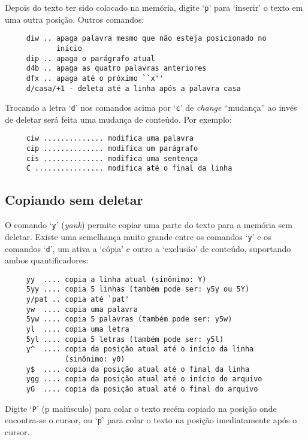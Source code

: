 Depois do texto ter sido colocado na memória, digite `{\tt p}' para `inserir' o
texto em uma outra posição. Outros comandos:

\begin{verbatim}
     diw .. apaga palavra mesmo que não esteja posicionado no 
            início
     dip .. apaga o parágrafo atual
     d4b .. apaga as quatro palavras anteriores
     dfx .. apaga até o próximo ``x''
     d/casa/+1 - deleta até a linha após a palavra casa
\end{verbatim}

Trocando a letra `{\tt d}' nos comandos acima por `{\tt c}' de {\em change}
``mudança'' ao invés de deletar será feita uma mudança de conteúdo.  Por
exemplo:

\begin{verbatim}
     ciw .............. modifica uma palavra
     cip .............. modifica um parágrafo
     cis .............. modifica uma sentença
     C ................ modifica até o final da linha
\end{verbatim}

\subsection{Copiando sem deletar}\label{Copiando sem deletar}

O comando `{\tt y}' ({\em yank}) permite copiar uma parte do 
texto para a memória sem deletar.  Existe uma semelhança muito grande entre 
os comandos `{\tt y}' e os comandos `{\tt d}', um ativa a `cópia' e outro a 
`exclusão' de conteúdo, suportando ambos quantificadores:

\begin{verbatim}
     yy  .... copia a linha atual (sinônimo: Y)
     5yy .... copia 5 linhas (também pode ser: y5y ou 5Y)
     y/pat .. copia até `pat'
     yw  .... copia uma palavra
     5yw .... copia 5 palavras (também pode ser: y5w)
     yl  .... copia uma letra
     5yl .... copia 5 letras (também pode ser: y5l)
     y^  .... copia da posição atual até o início da linha
              (sinônimo: y0)
     y$  .... copia da posição atual até o final da linha
     ygg .... copia da posição atual até o início do arquivo
     yG  .... copia da posição atual até o final do arquivo
\end{verbatim}

Digite `{\tt P}' (p maiúsculo) para colar o texto recém copiado na
posição onde encontra-se o cursor, ou `{\tt p}' para colar o texto na posição 
imediatamente após o cursor.

